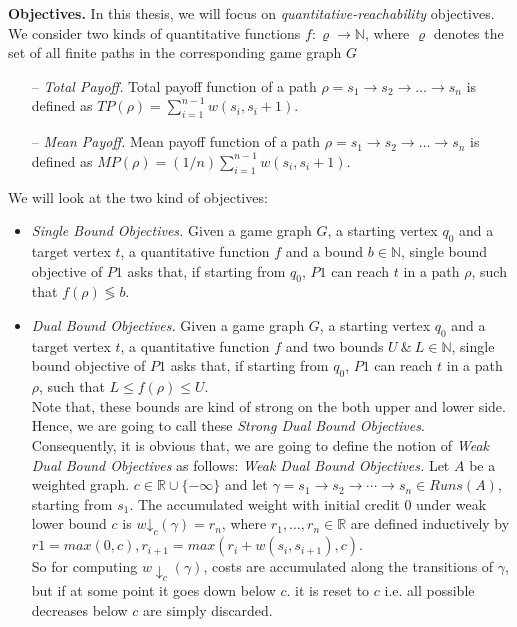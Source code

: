 \textbf{Objectives.} In this thesis, we will focus on \textit{quantitative-reachability} objectives. We consider two kinds of quantitative functions $f: \varrho \rightarrow \mathbb{N}$, where $\varrho$ denotes the set of all finite paths in the corresponding game graph $G$\\
\begin{itemize}
\item[--] \textit{Total Payoff.} Total payoff function of a path $\rho= s_1 \rightarrow s_2 \rightarrow \ldots \rightarrow s_n$ is defined as $TP(\rho)= \sum_{i=1}^{n-1} w(s_i,s_i+1)$.\\
\item[--] \textit{Mean Payoff.} Mean payoff function of a path $\rho= s_1 \rightarrow s_2 \rightarrow \ldots \rightarrow s_n$ is defined as $MP(\rho)= (1/n)\sum_{i=1}^{n-1} w(s_i,s_i+1)$.\\

\end{itemize}
 We will look at the two kind of objectives:\\
 \begin{itemize}
 \item \textit{Single Bound Objectives.} Given a game graph $G$, a starting vertex $q_0$ and a target vertex $t$, a quantitative function $f$ and a bound $b \in \mathbb{N}$, single bound objective of $P1$ asks that, if starting from $q_0$, $P1$ can reach $t$ in a path $\rho$, such that $f(\rho) \lessgtr b$.
 
 \item \textit{Dual Bound Objectives.} Given a game graph $G$, a starting vertex $q_0$ and a target vertex $t$, a quantitative function $f$ and two bounds $U\  \& \ L \in \mathbb{N}$, single bound objective of $P1$ asks that, if starting from $q_0$, $P1$ can reach $t$ in a path $\rho$, such that $L \leq f(\rho) \leq U$. \\
\vskip 1cm
Note that, these bounds are kind of strong on the both upper and lower side. Hence, we are going to call these \textit{Strong Dual Bound Objectives}. Consequently, it is obvious that, we are going to define the notion of \textit{Weak Dual Bound Objectives} as follows:
\vskip 0.5cm
\textit{Weak Dual Bound Objectives.} Let $A$ be a weighted graph. $c \in \mathbb{R} \cup \{- \infty\}$
and let $\gamma =s_1 \rightarrow s_2 \rightarrow \cdots \rightarrow s_n \in Runs(A)$, starting from $s_1$. The accumulated weight with
initial credit 0 under weak lower bound $c$ is $w\mathord{\downarrow}_{c}(\gamma) = r_n$, where $r_1, \ldots, r_n \in \mathbb{R}$
are defined inductively by $r1 = max(0,c), r_{i+1} = max(r_i + w(s_i, s_{i+1}), c)$.\\
So for computing $w\downarrow_{c}(\gamma)$, costs are accumulated along the transitions of $\gamma$,
but if at some point it goes down below $c$. it is reset to $c$  i.e. all possible decreases below $c$ are
simply discarded. \\
 \end{itemize}
 \vskip 0.2cm
 
